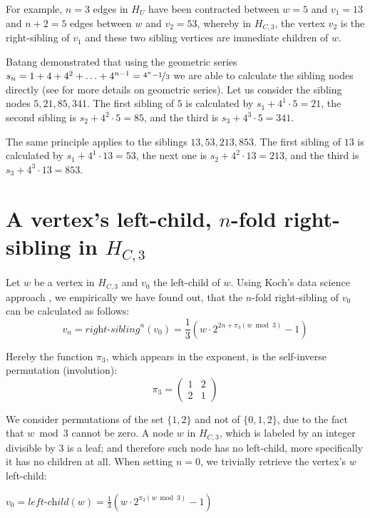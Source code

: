 For example, $n=3$ edges in $H_U$ have been contracted between $w=5$ and $v_1=13$ and $n+2=5$ edges between $w$ and $v_2=53$, whereby in $H_{C,3}$, the vertex $v_2$ is the right-sibling of $v_1$ and these two sibling vertices are immediate children of $w$.

Batang \cite{Ref_Batang} demonstrated that using the geometric series $s_n=1+4+4^2+\ldots+4^{n-1}=\nicefrac{4^n-1}{3}$ we are able to calculate the sibling nodes directly (see \cite[p.~191-192]{Ref_Teschl_2013} for more details on geometric series). Let us consider the sibling nodes $5,21,85,341$. The first sibling of $5$ is calculated by $s_1+4^1\cdot5=21$, the second sibling is $s_2+4^2\cdot5=85$, and the third is $s_3+4^3\cdot5=341$.

The same principle applies to the siblings $13,53,213,853$. The first sibling of $13$ is calculated by $s_1+4^1\cdot13=53$, the next one is $s_2+4^2\cdot13=213$, and the third is $s_3+4^3\cdot13=853$.

\section{\texorpdfstring{A vertex's left-child, $n$-fold right-sibling in $H_{C,3}$}{A vertex's left-child, n-fold right-sibling in HC3}}
\label{sec:left_child_right_sibling_3}

Let $w$ be a vertex in $H_{C,3}$ and $v_0$ the left-child of $w$. Using Koch's data science approach \cite{Ref_Koch_Github}, we empirically we have found out, that the $n$-fold right-sibling of $v_0$ can be calculated as follows:
\begin{equation}
\label{eq:nfold_right_sibling_3}
	v_n=\textit{right-sibling}^n(v_0)=\frac{1}{3}\left(w\cdot2^{2n+\pi_3(w\bmod 3)}-1\right)
\end{equation}

Hereby the function $\pi_3$, which appears in the exponent, is the self-inverse permutation (involution):
\begin{equation}
\label{eq:pi_3}
	\pi_3=\left(\begin{array}{cc}
	1 & 2\\
	2 & 1
	\end{array}\right)
\end{equation}

We consider permutations of the set $\{1,2\}$ and not of $\{0,1,2\}$, due to the fact that $w\bmod 3$ cannot be zero. A node $w$ in $H_{C,3}$, which is labeled by an integer divisible by $3$ is a leaf; and therefore such node has no left-child, more specifically it has no children at all. When setting $n=0$, we trivially retrieve the vertex's $w$ left-child:
\begin{center}
	$v_0=\textit{left-child}(w)=\frac{1}{3}\left(w\cdot2^{\pi_3(w\bmod 3)}-1\right)$
\end{center}

